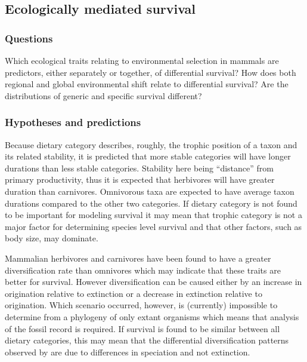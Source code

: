 \documentclass[12pt,letterpaper]{article}
\begin{document}
\subsection{Ecologically mediated survival} \label{sec:mamsurv}
\subsubsection{Questions} \label{sec:mamsurvques}
Which ecological traits relating to environmental selection in mammals are predictors, either separately or together, of differential survival? How does both regional and global environmental shift relate to differential survival? Are the distributions of generic and specific survival different? 

\subsubsection{Hypotheses and predictions} \label{sec:mamsurvback}
Because dietary category describes, roughly, the trophic position of a taxon and its related stability, it is predicted that more stable categories will have longer durations than less stable categories. Stability here being ``distance'' from primary productivity, thus it is expected that herbivores will have greater duration than carnivores. Omnivorous taxa are expected to have average taxon durations compared to the other two categories. If dietary category is not found to be important for modeling survival it may mean that trophic category is not a major factor for determining species level survival and that other factors, such as body size, may dominate. 

Mammalian herbivores and carnivores have been found to have a greater diversification rate than omnivores \citep{Price2012} which may indicate that these traits are better for survival. However diversification can be caused either by an increase in origination relative to extinction or a decrease in extinction relative to origination. Which scenario occurred, however, is (currently) impossible to determine from a phylogeny of only extant organisms \citep{Rabosky2010a} which means that analysis of the fossil record is required. If survival is found to be similar between all dietary categories, this may mean that the differential diversification patterns observed by \citet{Price2012} are due to differences in speciation and not extinction.
\end{document}
